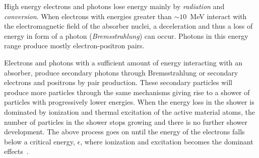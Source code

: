 High energy electrons and photons lose energy mainly by \emph{radiation} and
\emph{conversion}. When electrons with energies greater than $\sim 10$~MeV
interact with the electromagnetic field of the absorber nuclei, a deceleration
and thus a loss of energy in form of a photon (\emph{Bremsstrahlung}) can
occur. Photons in this energy range produce mostly electron-positron pairs.

Electrons and photons with a sufficient amount of energy interacting with an
absorber, produce secondary photons through Bremsstrahlung or secondary
electrons and positrons by pair production. These secondary particles will
produce more particles through the same mechanisms giving rise to a shower of
particles with progressively lower energies. When the energy loss in the shower
is dominated by ionization and thermal excitation of the active material atoms,
the number of particles in the shower stops growing and there is no further
shower development. The above process goes on until the energy of the electrons
falls below a critical energy, $\epsilon$, where ionization and excitation
becomes the dominant effects~\cite{Calorimetry}.
